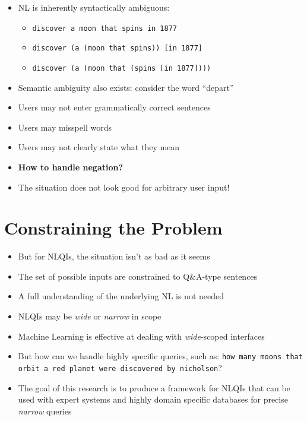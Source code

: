 \documentclass[logoontitle,tabu,supertabular,aspectratio=43]{preney-uwindsor-beamer}
\begin{document}
	\begin{frame}{\insertsection}
		\begin{itemize}
			\item NL is inherently syntactically ambiguous:
			\begin{itemize}
				\item \texttt{discover a moon that spins in 1877}
				\item \texttt{discover (a (moon that spins)) [in 1877]}
				\item \texttt{discover (a (moon that (spins [in 1877])))}
			\end{itemize}
			\item Semantic ambiguity also exists: consider the word ``depart''
			\item Users may not enter grammatically correct sentences
			\item Users may misspell words
			\item Users may not clearly state what they mean
            \item \textbf{How to handle negation?}
			\item The situation does not look good for arbitrary user input!
		\end{itemize}
	\end{frame}

	\section{Constraining the Problem}
	\begin{frame}{\insertsection}
		\begin{itemize}
			\item But for NLQIs, the situation isn't as bad as it seems
			\item The set of possible inputs are constrained to Q\&A-type sentences
			\item A full understanding of the underlying NL is not needed
			\item NLQIs may be {\em wide} or {\em narrow} in scope
			\item Machine Learning is effective at dealing with {\em wide}-scoped interfaces
			\item But how can we handle highly specific queries, such as: \texttt{how many moons that orbit a red planet were discovered by nicholson}?
			\item The goal of this research is to produce a framework for NLQIs that can be used with expert systems and highly domain specific databases for precise {\em narrow} queries
		\end{itemize}
	\end{frame}
\end{document}
